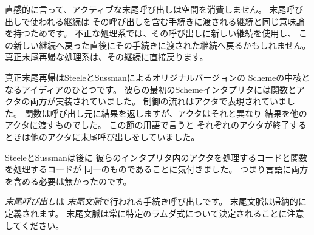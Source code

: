 \begin{rationale}

直感的に言って、アクティブな末尾呼び出しは空間を消費しません。
末尾呼び出しで使われる継続は
その呼び出しを含む手続きに渡される継続と同じ意味論を持つためです。
不正な処理系では、その呼び出しに新しい継続を使用し、
この新しい継続へ戻った直後にその手続きに渡された継続へ戻るかもしれません。
真正末尾再帰な処理系は、その継続に直接戻ります。

真正末尾再帰はSteeleとSussmanによるオリジナルバージョンの
Schemeの中核となるアイディアのひとつです。
彼らの最初のSchemeインタプリタには関数とアクタの両方が実装されていました。
制御の流れはアクタで表現されていました。
関数は呼び出し元に結果を返しますが、アクタはそれと異なり
結果を他のアクタに渡すものでした。
この節の用語で言うと
それぞれのアクタが終了するときは他のアクタに末尾呼び出しをしていました。

SteeleとSussmanは後に
彼らのインタプリタ内のアクタを処理するコードと関数を処理するコードが
同一のものであることに気付きました。
つまり言語に両方を含める必要は無かったのです。

\end{rationale}

{\em 末尾呼び出し}は
{\em 末尾文脈}で行われる手続き呼び出しです。
末尾文脈は帰納的に定義されます。
末尾文脈は常に特定のラムダ式について決定されることに注意してください。

